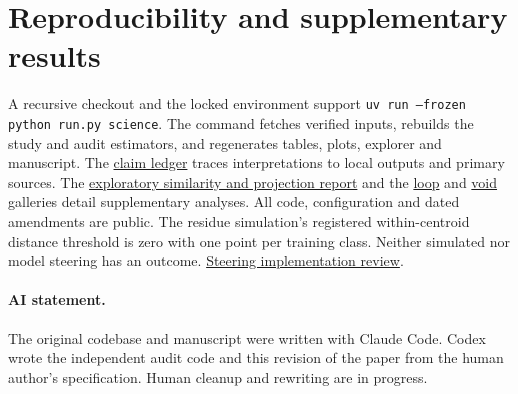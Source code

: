 \documentclass[10pt]{article}
\newcommand{\evidence}[2]{\href{https://github.com/BurnyCoder/topology-of-neural-geometry-in-llm-mechanistic-interpretability/blob/main/#1}{#2}}
\begin{document}
\section{Reproducibility and supplementary results}
A recursive checkout and the locked environment support \texttt{uv run --frozen python run.py science}. The command fetches verified inputs, rebuilds the study and audit estimators, and regenerates tables, plots, explorer and manuscript. The \evidence{reports/reviews/2026-11-26-claims.tsv}{claim ledger} traces interpretations to local outputs and primary sources. The \evidence{reports/exp4_exp5.md}{exploratory similarity and projection report} and the \evidence{reports/loops.md}{loop} and \evidence{reports/voids.md}{void} galleries detail supplementary analyses. All code, configuration and dated amendments are public. The residue simulation's registered within-centroid distance threshold is zero with one point per training class. Neither simulated nor model steering has an outcome. \evidence{reports/exp6_steering.md}{Steering implementation review}.




\paragraph{AI statement.} The original codebase and manuscript were written with Claude Code. Codex wrote the independent audit code and this revision of the paper from the human author's specification. Human cleanup and rewriting are in progress.
\end{document}
